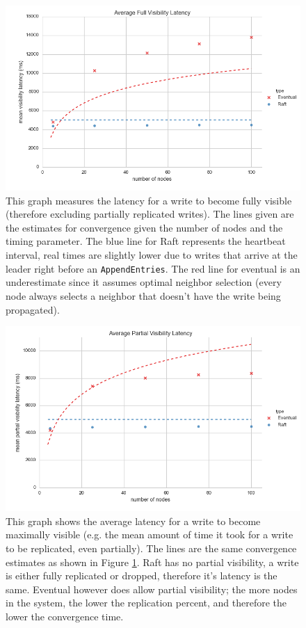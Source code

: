 \documentclass[11pt,letterpaper]{article}
\begin{document}
\begin{figure}[!h]
    \centering
        \includegraphics[width=\textwidth]{hcfigures/visibility_latency.png}
        \caption{\textsf{This graph measures the latency for a write to become fully visible (therefore excluding partially replicated writes). The lines given are the estimates for convergence given the number of nodes and the timing parameter. The blue line for Raft represents the heartbeat interval, real times are slightly lower due to writes that arrive at the leader right before an \texttt{AppendEntries}. The red line for eventual is an underestimate since it assumes optimal neighbor selection (every node always selects a neighbor that doesn't have the write being propagated).}}
        \label{fig:visibility_latency}
\end{figure}

\begin{figure}[!h]
    \centering
        \includegraphics[width=\textwidth]{hcfigures/partial_visibility_latency.png}
        \caption{\textsf{This graph shows the average latency for a write to become maximally visible (e.g. the mean amount of time it took for a write to be replicated, even partially). The lines are the same convergence estimates as shown in Figure \ref{fig:visibility_latency}. Raft has no partial visibility, a write is either fully replicated or dropped, therefore it's latency is the same. Eventual however does allow partial visibility; the more nodes in the system, the lower the replication percent, and therefore the lower the convergence time.}}
        \label{fig:partial_visibility_latency}
\end{figure}
\end{document}
